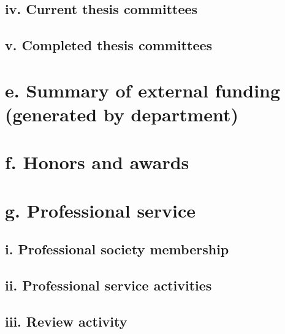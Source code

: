 \documentclass{article}
\begin{document}


\subsection*{iv. Current thesis committees}



\subsection*{v. Completed thesis committees}




\section*{e. Summary of external funding (generated by department)}


\section*{f. Honors and awards}




\section*{g. Professional service}

\subsection*{i. Professional society membership}



\subsection*{ii. Professional service activities}



\subsection*{iii. Review activity}
\end{document}
